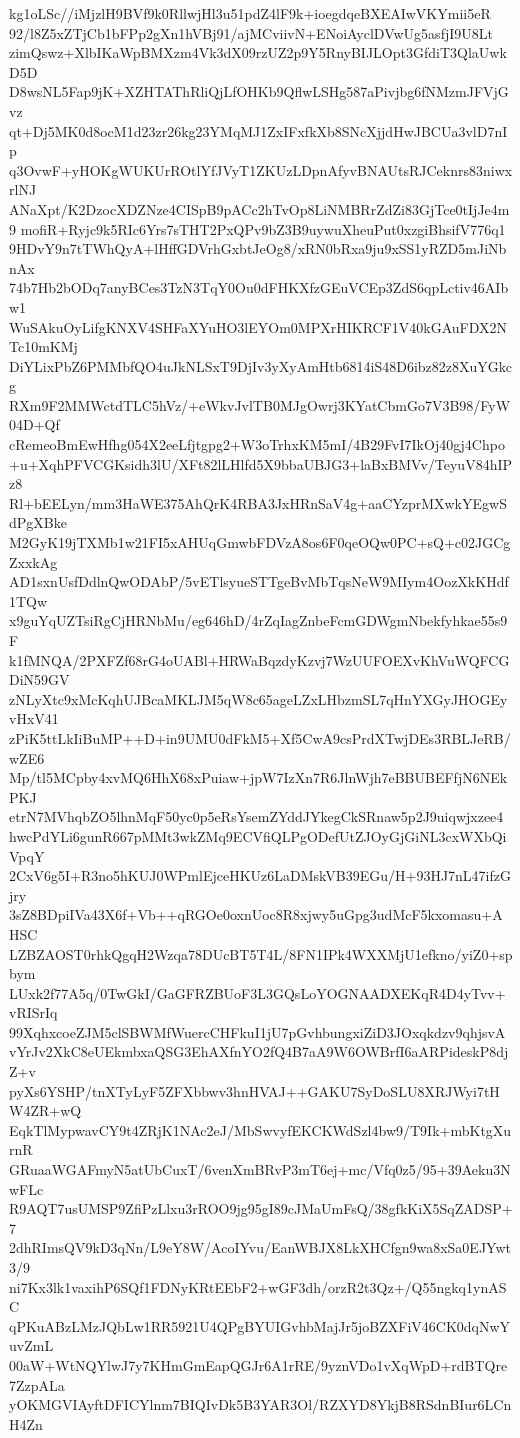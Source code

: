 kg1oLSc//iMjzlH9BVf9k0RllwjHl3u51pdZ4lF9k+ioegdqeBXEAIwVKYmii5eR
92/l8Z5xZTjCb1bFPp2gXn1hVBj91/ajMCviivN+ENoiAyclDVwUg5asfjI9U8Lt
zimQswz+XlbIKaWpBMXzm4Vk3dX09rzUZ2p9Y5RnyBIJLOpt3GfdiT3QlaUwkD5D
D8wsNL5Fap9jK+XZHTAThRliQjLfOHKb9QflwLSHg587aPivjbg6fNMzmJFVjGvz
qt+Dj5MK0d8ocM1d23zr26kg23YMqMJ1ZxIFxfkXb8SNcXjjdHwJBCUa3vlD7nIp
q3OvwF+yHOKgWUKUrROtlYfJVyT1ZKUzLDpnAfyvBNAUtsRJCeknrs83niwxrlNJ
ANaXpt/K2DzocXDZNze4CISpB9pACc2hTvOp8LiNMBRrZdZi83GjTce0tIjJe4m9
mofiR+Ryjc9k5RIc6Yrs7sTHT2PxQPv9bZ3B9uywuXheuPut0xzgiBhsifV776q1
9HDvY9n7tTWhQyA+lHffGDVrhGxbtJeOg8/xRN0bRxa9ju9xSS1yRZD5mJiNbnAx
74b7Hb2bODq7anyBCes3TzN3TqY0Ou0dFHKXfzGEuVCEp3ZdS6qpLctiv46AIbw1
WuSAkuOyLifgKNXV4SHFaXYuHO3lEYOm0MPXrHIKRCF1V40kGAuFDX2NTc10mKMj
DiYLixPbZ6PMMbfQO4uJkNLSxT9DjIv3yXyAmHtb6814iS48D6ibz82z8XuYGkcg
RXm9F2MMWctdTLC5hVz/+eWkvJvlTB0MJgOwrj3KYatCbmGo7V3B98/FyW04D+Qf
cRemeoBmEwHfhg054X2eeLfjtgpg2+W3oTrhxKM5mI/4B29FvI7IkOj40gj4Chpo
+u+XqhPFVCGKsidh3lU/XFt82lLHlfd5X9bbaUBJG3+laBxBMVv/TeyuV84hIPz8
Rl+bEELyn/mm3HaWE375AhQrK4RBA3JxHRnSaV4g+aaCYzprMXwkYEgwSdPgXBke
M2GyK19jTXMb1w21FI5xAHUqGmwbFDVzA8os6F0qeOQw0PC+sQ+c02JGCgZxxkAg
AD1sxnUsfDdlnQwODAbP/5vETlsyueSTTgeBvMbTqsNeW9MIym4OozXkKHdf1TQw
x9guYqUZTsiRgCjHRNbMu/eg646hD/4rZqIagZnbeFcmGDWgmNbekfyhkae55s9F
k1fMNQA/2PXFZf68rG4oUABl+HRWaBqzdyKzvj7WzUUFOEXvKhVuWQFCGDiN59GV
zNLyXtc9xMcKqhUJBcaMKLJM5qW8c65ageLZxLHbzmSL7qHnYXGyJHOGEyvHxV41
zPiK5ttLkIiBuMP++D+in9UMU0dFkM5+Xf5CwA9csPrdXTwjDEs3RBLJeRB/wZE6
Mp/tl5MCpby4xvMQ6HhX68xPuiaw+jpW7IzXn7R6JlnWjh7eBBUBEFfjN6NEkPKJ
etrN7MVhqbZO5lhnMqF50yc0p5eRsYsemZYddJYkegCkSRnaw5p2J9uiqwjxzee4
hwcPdYLi6gunR667pMMt3wkZMq9ECVfiQLPgODefUtZJOyGjGiNL3cxWXbQiVpqY
2CxV6g5I+R3no5hKUJ0WPmlEjceHKUz6LaDMskVB39EGu/H+93HJ7nL47ifzGjry
3sZ8BDpiIVa43X6f+Vb++qRGOe0oxnUoc8R8xjwy5uGpg3udMcF5kxomasu+AHSC
LZBZAOST0rhkQgqH2Wzqa78DUcBT5T4L/8FN1IPk4WXXMjU1efkno/yiZ0+spbym
LUxk2f77A5q/0TwGkI/GaGFRZBUoF3L3GQsLoYOGNAADXEKqR4D4yTvv+vRISrIq
99XqhxcoeZJM5clSBWMfWuercCHFkuI1jU7pGvhbungxiZiD3JOxqkdzv9qhjsvA
vYrJv2XkC8eUEkmbxaQSG3EhAXfnYO2fQ4B7aA9W6OWBrfI6aARPideskP8djZ+v
pyXs6YSHP/tnXTyLyF5ZFXbbwv3hnHVAJ++GAKU7SyDoSLU8XRJWyi7tHW4ZR+wQ
EqkTlMypwavCY9t4ZRjK1NAc2eJ/MbSwvyfEKCKWdSzl4bw9/T9Ik+mbKtgXurnR
GRuaaWGAFmyN5atUbCuxT/6venXmBRvP3mT6ej+mc/Vfq0z5/95+39Aeku3NwFLc
R9AQT7usUMSP9ZfiPzLlxu3rROO9jg95gI89cJMaUmFsQ/38gfkKiX5SqZADSP+7
2dhRImsQV9kD3qNn/L9eY8W/AcoIYvu/EanWBJX8LkXHCfgn9wa8xSa0EJYwt3/9
ni7Kx3lk1vaxihP6SQf1FDNyKRtEEbF2+wGF3dh/orzR2t3Qz+/Q55ngkq1ynASC
qPKuABzLMzJQbLw1RR5921U4QPgBYUIGvhbMajJr5joBZXFiV46CK0dqNwYuvZmL
00aW+WtNQYlwJ7y7KHmGmEapQGJr6A1rRE/9yznVDo1vXqWpD+rdBTQre7ZzpALa
yOKMGVIAyftDFICYlnm7BIQIvDk5B3YAR3Ol/RZXYD8YkjB8RSdnBIur6LCnH4Zn
